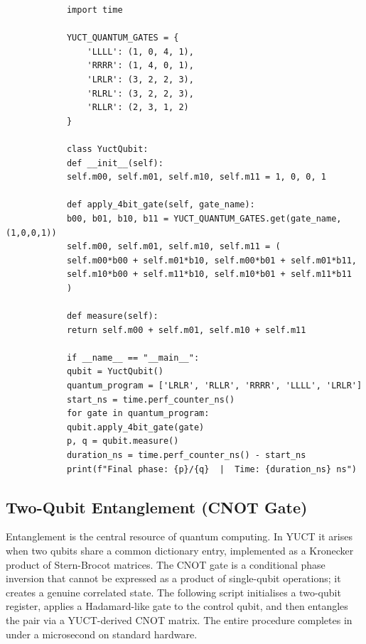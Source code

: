 \documentclass[12pt,a4paper]{article}
\begin{document}
	\begin{tcolorbox}[title=YUCT Single-Qubit Emulator (Python), breakable]
		\begin{lstlisting}
			import time
			
			YUCT_QUANTUM_GATES = {
				'LLLL': (1, 0, 4, 1),
				'RRRR': (1, 4, 0, 1),
				'LRLR': (3, 2, 2, 3),
				'RLRL': (3, 2, 2, 3),
				'RLLR': (2, 3, 1, 2)
			}
			
			class YuctQubit:
			def __init__(self):
			self.m00, self.m01, self.m10, self.m11 = 1, 0, 0, 1
			
			def apply_4bit_gate(self, gate_name):
			b00, b01, b10, b11 = YUCT_QUANTUM_GATES.get(gate_name, (1,0,0,1))
			self.m00, self.m01, self.m10, self.m11 = (
			self.m00*b00 + self.m01*b10, self.m00*b01 + self.m01*b11,
			self.m10*b00 + self.m11*b10, self.m10*b01 + self.m11*b11
			)
			
			def measure(self):
			return self.m00 + self.m01, self.m10 + self.m11
			
			if __name__ == "__main__":
			qubit = YuctQubit()
			quantum_program = ['LRLR', 'RLLR', 'RRRR', 'LLLL', 'LRLR']
			start_ns = time.perf_counter_ns()
			for gate in quantum_program:
			qubit.apply_4bit_gate(gate)
			p, q = qubit.measure()
			duration_ns = time.perf_counter_ns() - start_ns
			print(f"Final phase: {p}/{q}  |  Time: {duration_ns} ns")
		\end{lstlisting}
	\end{tcolorbox}
	
	\subsection{Two-Qubit Entanglement (CNOT Gate)}
	
	Entanglement is the central resource of quantum computing.  In YUCT it arises when two qubits share a common dictionary entry, implemented as a Kronecker product of Stern-Brocot matrices.  The CNOT gate is a conditional phase inversion that cannot be expressed as a product of single-qubit operations; it creates a genuine correlated state.  The following script initialises a two-qubit register, applies a Hadamard-like gate to the control qubit, and then entangles the pair via a YUCT-derived CNOT matrix.  The entire procedure completes in under a microsecond on standard hardware.
	
\end{document}
